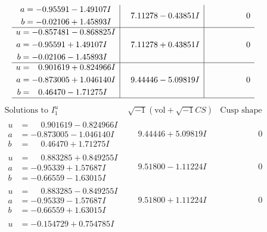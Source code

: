 \documentclass[1p]{elsarticle_modified}
\theoremstyle{definition}
\newcommand{\I}{\sqrt{-1}}
\begin{document}
$$\begin{array}{c|c|c}
\begin{aligned}
a &= -0.95591 - 1.49107 I \\
b &= -0.02106 + 1.45893 I\end{aligned}
 & \phantom{-}7.11278 - 0.43851 I & \phantom{-0.000000 } 0 \\ \hline\begin{aligned}
u &= -0.857481 - 0.868825 I \\
a &= -0.95591 + 1.49107 I \\
b &= -0.02106 - 1.45893 I\end{aligned}
 & \phantom{-}7.11278 + 0.43851 I & \phantom{-0.000000 } 0 \\ \hline\begin{aligned}
u &= \phantom{-}0.901619 + 0.824966 I \\
a &= -0.873005 + 1.046140 I \\
b &= \phantom{-}0.46470 - 1.71275 I\end{aligned}
 & \phantom{-}9.44446 - 5.09819 I & \phantom{-0.000000 } 0\\
 \hline 
 \end{array}$$\newpage$$\begin{array}{c|c|c}  
\text{Solutions to }I^u_{1}& \I (\text{vol} + \sqrt{-1}CS) & \text{Cusp shape}\\
 \hline 
\begin{aligned}
u &= \phantom{-}0.901619 - 0.824966 I \\
a &= -0.873005 - 1.046140 I \\
b &= \phantom{-}0.46470 + 1.71275 I\end{aligned}
 & \phantom{-}9.44446 + 5.09819 I & \phantom{-0.000000 } 0 \\ \hline\begin{aligned}
u &= \phantom{-}0.883285 + 0.849255 I \\
a &= -0.95339 + 1.57687 I \\
b &= -0.66559 - 1.63015 I\end{aligned}
 & \phantom{-}9.51800 - 1.11224 I & \phantom{-0.000000 } 0 \\ \hline\begin{aligned}
u &= \phantom{-}0.883285 - 0.849255 I \\
a &= -0.95339 - 1.57687 I \\
b &= -0.66559 + 1.63015 I\end{aligned}
 & \phantom{-}9.51800 + 1.11224 I & \phantom{-0.000000 } 0 \\ \hline\begin{aligned}
u &= -0.154729 + 0.754785 I \\

\end{aligned}
\end{array}$$
\end{document}
